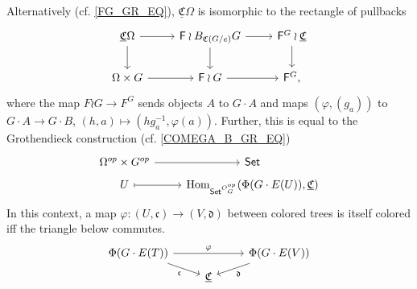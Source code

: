 \documentclass[a4paper,10pt
]{article}%
\renewcommand{\phi}{\varphi}
\newcommand{\UC}{\underline{\mathfrak C}}
\renewcommand{\1}{\ensuremath{\mathbb{id}}}
\begin{document}
\begin{remark}
      {\color{blue} %
      Alternatively (cf. \eqref{FG_GR_EQ}),
      $\UC \Omega$ is isomorphic to the rectangle of pullbacks
      \begin{equation}
            \label{COMEGA_FG_EQ}
            \begin{tikzcd}
                  \UC \Omega \arrow[d] \arrow[r]
                  &
                  \mathsf F \wr B_{\mathfrak C(G/e)}G \arrow[r] \arrow[d]
                  &
                  \mathsf F^G \wr \UC \arrow[d]
                  \\
                  \Omega \times G \arrow[r]
                  &
                  \mathsf F \wr G \arrow[r]
                  &
                  \mathsf F^G,
            \end{tikzcd}
      \end{equation}
      where the map $F \wr G \to F^G$ sends objects $A$ to $G \cdot A$ and
      maps $(\phi, (g_a))$ to $G \cdot A \to G \cdot B$, $(h, a) \mapsto (h g_a^{-1}, \phi(a))$.
      Further, this is equal to the Grothendieck construction (cf. \eqref{COMEGA_B_GR_EQ})
      \begin{equation}
            \label{COMEGA_FG_GR_EQ}
            \begin{tikzcd}[row sep = tiny]
                  \Omega^{op} \times G^{op} \arrow[r]
                  &
                  \mathsf{Set}
                  \\
                  U \arrow[r, mapsto]
                  &
                  \Hom_{\mathsf{Set}^{O_G^{op}}}(\Phi(G \cdot E(U)), \UC)
            \end{tikzcd}
      \end{equation}
      In this context, a map $\phi: (U,\mathfrak c) \to (V, \mathfrak d)$ between colored trees is itself colored iff
      the triangle below commutes.
      \begin{equation}
            \label{COLOR_MAP_FG_EQ}
            \begin{tikzcd}[row sep = tiny]
                  \Phi(G \cdot E(T)) \arrow[rr, "\phi"] \arrow[dr, "\mathfrak c"']
                  &&
                  \Phi(G \cdot E(V)) \arrow[dl, "\mathfrak d"]
                  \\
                  &
                  \UC
            \end{tikzcd}
      \end{equation}
      } %
\end{remark}
\end{document}
